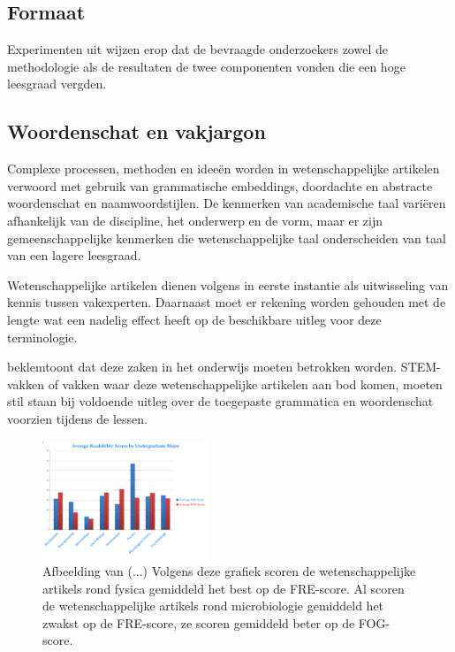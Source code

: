 
\subsection{Formaat}

Experimenten uit \textcite{Hubbard2017} wijzen erop dat de bevraagde onderzoekers zowel de methodologie als de resultaten de twee componenten vonden die een hoge leesgraad vergden. 


\subsection{Woordenschat en vakjargon}

Complexe processen, methoden en ideeën worden in wetenschappelijke artikelen verwoord met gebruik van grammatische embeddings, doordachte en abstracte woordenschat en naamwoordstijlen. De kenmerken van academische taal variëren afhankelijk van de discipline, het onderwerp en de vorm, maar er zijn gemeenschappelijke kenmerken die wetenschappelijke taal onderscheiden van taal van een lagere leesgraad. \autocite{Ennals2010, Snow2010}

Wetenschappelijke artikelen dienen volgens \textcite{PlavenSigray2017} in eerste instantie als uitwisseling van kennis tussen vakexperten. Daarnaast moet er rekening worden gehouden met de lengte wat een nadelig effect heeft op de beschikbare uitleg voor deze terminologie.

\textcite{Snow2010} beklemtoont dat deze zaken in het onderwijs moeten betrokken worden. STEM-vakken of vakken waar deze wetenschappelijke artikelen aan bod komen, moeten stil staan bij voldoende uitleg over de toegepaste grammatica en woordenschat voorzien tijdens de lessen.



\begin{figure}[H]
	\includegraphics[width=5cm]{img/fre-fog-per-sector.png}
	\caption{Afbeelding van (...) Volgens deze grafiek scoren de wetenschappelijke artikels rond fysica gemiddeld het best op de FRE-score. Al scoren de wetenschappelijke artikels rond microbiologie gemiddeld het zwakst op de FRE-score, ze scoren gemiddeld beter op de FOG-score.}
\end{figure}

